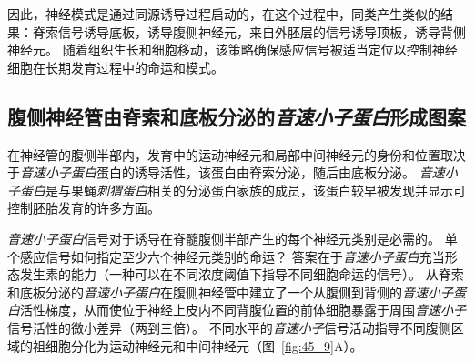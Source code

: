 因此，神经模式是通过同源诱导过程启动的，在这个过程中，同类产生类似的结果：脊索信号诱导底板，诱导腹侧神经元，来自外胚层的信号诱导顶板，诱导背侧神经元。
随着组织生长和细胞移动，该策略确保感应信号被适当定位以控制神经细胞在长期发育过程中的命运和模式。



\subsection{腹侧神经管由脊索和底板分泌的\textit{音速小子蛋白}形成图案}

在神经管的腹侧半部内，发育中的运动神经元和局部中间神经元的身份和位置取决于\textit{音速小子蛋白}蛋白的诱导活性，该蛋白由脊索分泌，随后由底板分泌。
\textit{音速小子蛋白}是与果蝇\textit{刺猬蛋白}相关的分泌蛋白家族的成员，该蛋白较早被发现并显示可控制胚胎发育的许多方面。


\textit{音速小子蛋白}信号对于诱导在脊髓腹侧半部产生的每个神经元类别是必需的。
单个感应信号如何指定至少六个神经元类别的命运？
答案在于\textit{音速小子蛋白}充当形态发生素的能力（一种可以在不同浓度阈值下指导不同细胞命运的信号）。
从脊索和底板分泌的\textit{音速小子蛋白}在腹侧神经管中建立了一个从腹侧到背侧的\textit{音速小子蛋白}活性梯度，从而使位于神经上皮内不同背腹位置的前体细胞暴露于周围\textit{音速小子}信号活性的微小差异（两到三倍）。
不同水平的\textit{音速小子}信号活动指导不同腹侧区域的祖细胞分化为运动神经元和中间神经元（图~\ref{fig:45_9}A）。


